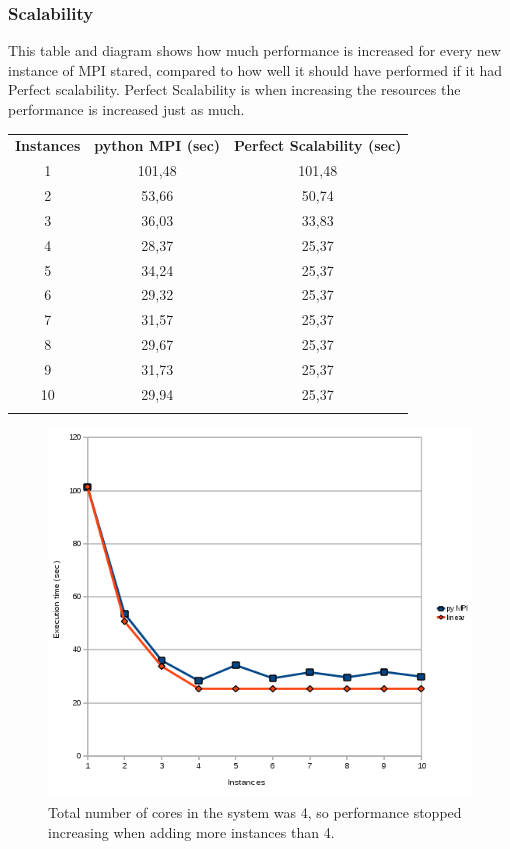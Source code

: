 \documentclass{article}
\begin{document}
{\subsubsection{Scalability}
This table and diagram shows how much performance is increased for every
new instance of MPI stared, compared to how well it should have performed
if it had Perfect scalability\cite{jogalekar2000evaluating}. Perfect
Scalability is when increasing the resources the performance is increased
just as much. 
\begin{table}[h!]
\begin{tabular}{c c c}
  \rowcolor[gray]{0.5}
  {\bf Instances} & {\bf python MPI (sec)} & {\bf Perfect Scalability (sec)} \\
  1 & 101,48 & 101,48 \\
  2 & 53,66  & 50,74  \\
  3 & 36,03  & 33,83  \\
  4 & 28,37  & 25,37  \\
  5 & 34,24  & 25,37  \\
  6 & 29,32  & 25,37  \\
  7 & 31,57  & 25,37  \\
  8 & 29,67  & 25,37  \\
  9 & 31,73  & 25,37  \\
 10 & 29,94  & 25,37  \\
\rowcolor[gray]{0.5}
\end{tabular}
\end{table}
\begin{figure}[h!]
\center

\includegraphics[width=\textwidth]{img/scalabilty-pympi.png}
\caption{Total number of cores in the system was 4, so performance stopped
increasing when adding more instances than 4. }
\end{figure}

}
\end{document}
